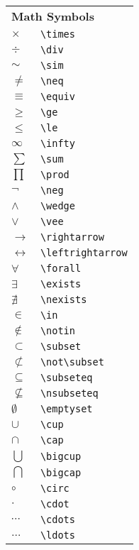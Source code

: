 \documentclass[12pt,a4paper]{article}
\begin{document}
\hspace*{2ex}
\begin{tabular}[t]{ll}
\multicolumn{2}{l}{\textbf{Math Symbols}} \\
$\times$ & \verb$\times$ \\
$\div$ & \verb$\div$ \\
$\sim$ & \verb$\sim$ \\
$\neq$ & \verb $\neq$ \\
$\equiv$ & \verb$\equiv$ \\
$\ge$ & \verb$\ge$ \\
$\le$ & \verb$\le$ \\
$\infty$ & \verb$\infty$ \\
$\sum$ & \verb$\sum$ \\
$\prod$ & \verb$\prod$ \\
$\neg$ & \verb$\neg$ \\
$\wedge$ & \verb$\wedge$ \\
$\vee$ & \verb$\vee$ \\
$\rightarrow$ & \verb$\rightarrow$ \\
$\leftrightarrow$ & \verb$\leftrightarrow$ \\
$\forall$ & \verb$\forall$ \\
$\exists$ & \verb$\exists$ \\
$\nexists$ & \verb$\nexists$ \\
$\in$ & \verb$\in$ \\
$\notin$ & \verb$\notin$ \\
$\subset$ & \verb$\subset$ \\
$\not\subset$ & \verb$\not\subset$ \\
$\subseteq$ & \verb$\subseteq$ \\
$\nsubseteq$ & \verb$\nsubseteq$ \\
$\emptyset$ & \verb$\emptyset$  \\
$\cup $ & \verb$\cup$ \\
$\cap $ & \verb$\cap$ \\
$\bigcup$ & \verb$\bigcup$ \\
$\bigcap$ & \verb$\bigcap$ \\
$\circ$ & \verb$\circ$ \\
$\cdot$ & \verb$\cdot$ \\
$\cdots$ & \verb$\cdots$ \\
$\ldots$ & \verb$\ldots$ \\
\end{tabular}
\hspace*{1ex}
\end{document}
